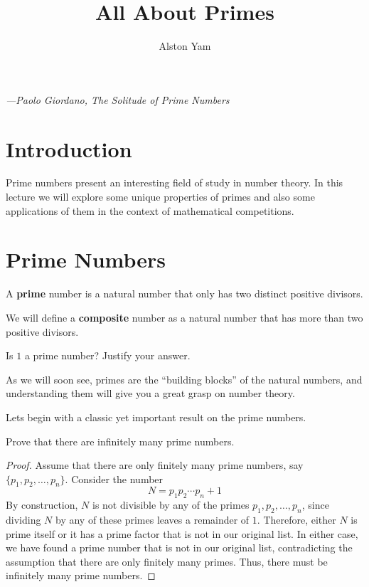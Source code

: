 \documentclass{article}
\title{All About Primes}
\date{}
\author{Alston Yam}
\theoremstyle{mytheoremstyle}
\theoremstyle{mytheoremstyle}
\theoremstyle{myproblemstyle}
\theoremstyle{myproblemstyle}
\theoremstyle{myproblemstyle}
\begin{document}
    \maketitle
    \begin{center}
        
        \begin{flushright}
            \textit{—Paolo Giordano, The Solitude of Prime Numbers}
        \end{flushright}
    \end{center}
        

    \section{Introduction}
    Prime numbers present an interesting field of study in number theory. In this lecture we will explore some unique properties of primes and also some applications of them in the context of mathematical competitions.
    \section{Prime Numbers}

    \begin{definition}
        A \textbf{prime} number is a natural number that only has two distinct positive divisors.
    \end{definition}


    We will define a \textbf{composite} number as a natural number that has more than two positive divisors.
    
    \begin{exercise}
        Is $1$ a prime number? Justify your answer.
    \end{exercise}
    
    As we will soon see, primes are the ``building blocks'' of the natural numbers, and understanding them will give you a great grasp on number theory. 
    \vspace{5pt}

    Lets begin with a classic yet important result on the prime numbers.
    \begin{theorem}\label{Euclid's theorem}
        Prove that there are infinitely many prime numbers.
    \end{theorem} 

    \begin{proof}
        Assume that there are only finitely many prime numbers, say $\{p_1, p_2, \ldots, p_n\}$. Consider the number $$N = p_1 p_2 \cdots p_n + 1$$
        By construction, $N$ is not divisible by any of the primes $p_1, p_2, \ldots, p_n$, since dividing $N$ by any of these primes leaves a remainder of $1$. Therefore, either $N$ is prime itself or it has a prime factor that is not in our original list. 
        In either case, we have found a prime number that is not in our original list, contradicting the assumption that there are only finitely many primes. Thus, there must be infinitely many prime numbers.
    \end{proof}
\end{document}
